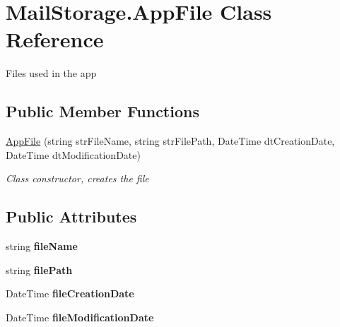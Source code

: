 \hypertarget{class_mail_storage_1_1_app_file}{}\section{Mail\+Storage.\+App\+File Class Reference}
\label{class_mail_storage_1_1_app_file}


Files used in the app  


\subsection*{Public Member Functions}
\begin{DoxyCompactItemize}
\item 
\hyperlink{class_mail_storage_1_1_app_file_a7d30bfd52976376bf98a71d7f0f2941d}{App\+File} (string str\+File\+Name, string str\+File\+Path, Date\+Time dt\+Creation\+Date, Date\+Time dt\+Modification\+Date)
\begin{DoxyCompactList}\small\item\em Class constructor, creates the file \end{DoxyCompactList}\end{DoxyCompactItemize}
\subsection*{Public Attributes}
\begin{DoxyCompactItemize}
\item 
\mbox{\label{class_mail_storage_1_1_app_file_a3181bcb2f55c1e643b00b7b4584b8ed8}} 
string {\bfseries file\+Name}
\item 
\mbox{\label{class_mail_storage_1_1_app_file_a5b11dbe8241895ece9e3858b46e53d5a}} 
string {\bfseries file\+Path}
\item 
\mbox{\label{class_mail_storage_1_1_app_file_ad293ee96f042c3b06bf60901b86b7421}} 
Date\+Time {\bfseries file\+Creation\+Date}
\item 
\mbox{\label{class_mail_storage_1_1_app_file_a80115409ccdda1de48224beb8c1c22dc}} 
Date\+Time {\bfseries file\+Modification\+Date}
\end{DoxyCompactItemize}


